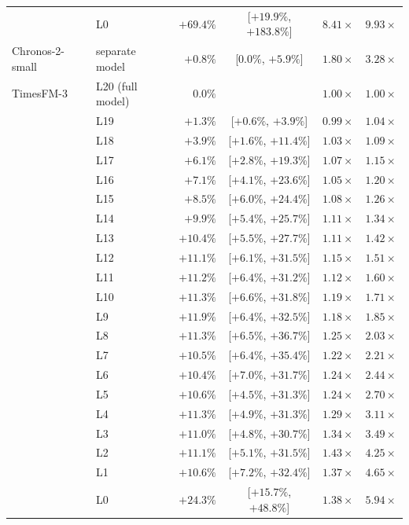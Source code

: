 \documentclass{article} %
\begin{document}
\begin{table}[p]
\begin{tabular}{@{}llrcrr@{}}
 & L0 & $+69.4\%$ & [$+19.9\%$, $+183.8\%$] & $8.41\times$ & $9.93\times$ \\
\addlinespace
Chronos-2-small & separate model & $+0.8\%$ & [$0.0\%$, $+5.9\%$] & $1.80\times$ & $3.28\times$ \\
\midrule
TimesFM-3 & L20 (full model) & $0.0\%$ &  & $1.00\times$ & $1.00\times$ \\
 & L19 & $+1.3\%$ & [$+0.6\%$, $+3.9\%$] & $0.99\times$ & $1.04\times$ \\
 & L18 & $+3.9\%$ & [$+1.6\%$, $+11.4\%$] & $1.03\times$ & $1.09\times$ \\
 & L17 & $+6.1\%$ & [$+2.8\%$, $+19.3\%$] & $1.07\times$ & $1.15\times$ \\
 & L16 & $+7.1\%$ & [$+4.1\%$, $+23.6\%$] & $1.05\times$ & $1.20\times$ \\
 & L15 & $+8.5\%$ & [$+6.0\%$, $+24.4\%$] & $1.08\times$ & $1.26\times$ \\
 & L14 & $+9.9\%$ & [$+5.4\%$, $+25.7\%$] & $1.11\times$ & $1.34\times$ \\
 & L13 & $+10.4\%$ & [$+5.5\%$, $+27.7\%$] & $1.11\times$ & $1.42\times$ \\
 & L12 & $+11.1\%$ & [$+6.1\%$, $+31.5\%$] & $1.15\times$ & $1.51\times$ \\
 & L11 & $+11.2\%$ & [$+6.4\%$, $+31.2\%$] & $1.12\times$ & $1.60\times$ \\
 & L10 & $+11.3\%$ & [$+6.6\%$, $+31.8\%$] & $1.19\times$ & $1.71\times$ \\
 & L9 & $+11.9\%$ & [$+6.4\%$, $+32.5\%$] & $1.18\times$ & $1.85\times$ \\
 & L8 & $+11.3\%$ & [$+6.5\%$, $+36.7\%$] & $1.25\times$ & $2.03\times$ \\
 & L7 & $+10.5\%$ & [$+6.4\%$, $+35.4\%$] & $1.22\times$ & $2.21\times$ \\
 & L6 & $+10.4\%$ & [$+7.0\%$, $+31.7\%$] & $1.24\times$ & $2.44\times$ \\
 & L5 & $+10.6\%$ & [$+4.5\%$, $+31.3\%$] & $1.24\times$ & $2.70\times$ \\
 & L4 & $+11.3\%$ & [$+4.9\%$, $+31.3\%$] & $1.29\times$ & $3.11\times$ \\
 & L3 & $+11.0\%$ & [$+4.8\%$, $+30.7\%$] & $1.34\times$ & $3.49\times$ \\
 & L2 & $+11.1\%$ & [$+5.1\%$, $+31.5\%$] & $1.43\times$ & $4.25\times$ \\
 & L1 & $+10.6\%$ & [$+7.2\%$, $+32.4\%$] & $1.37\times$ & $4.65\times$ \\
 & L0 & $+24.3\%$ & [$+15.7\%$, $+48.8\%$] & $1.38\times$ & $5.94\times$ \\

\end{tabular}
\end{table}
\end{document}
